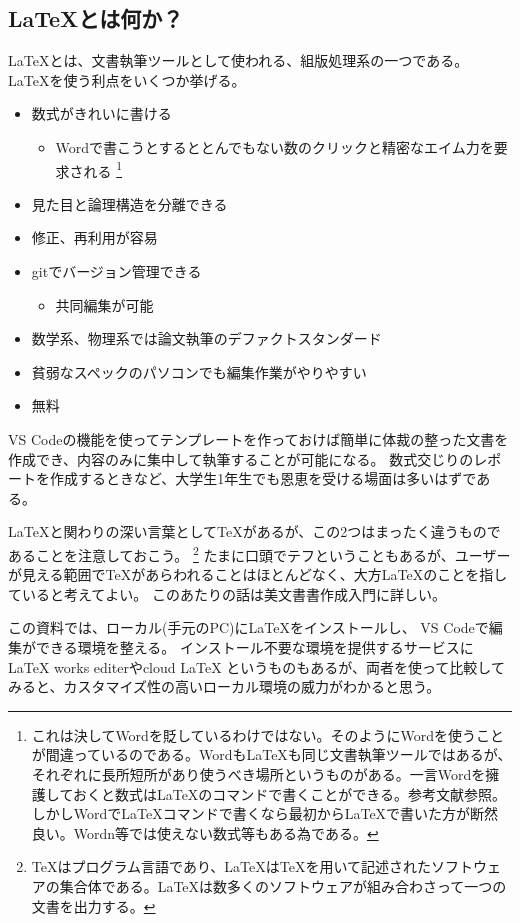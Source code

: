 \documentclass[titlepage]{ltjsarticle}
\begin{document}
\subsection{\LaTeX とは何か？}
\LaTeX とは、文書執筆ツールとして使われる、組版処理系の一つである。
\LaTeX を使う利点をいくつか挙げる。
\begin{itemize}
  \item 数式がきれいに書ける
  \begin{itemize}
    \item Wordで書こうとするととんでもない数のクリックと精密なエイム力を要求される
    \footnote{これは決してWordを貶しているわけではない。そのようにWordを使うことが間違っているのである。Wordも\LaTeX も同じ文書執筆ツールではあるが、それぞれに長所短所があり使うべき場所というものがある。一言Wordを擁護しておくと数式は\LaTeX のコマンドで書くことができる。参考文献\cite{WordでLaTeX}参照。しかしWordでLaTeXコマンドで書くなら最初から\LaTeX で書いた方が断然良い。Wordn等では使えない数式等もある為である。}
  \end{itemize}
  \item 見た目と論理構造を分離できる
  \item 修正、再利用が容易
  \item gitでバージョン管理できる
  \begin{itemize}
    \item 共同編集が可能
  \end{itemize}
  \item 数学系、物理系では論文執筆のデファクトスタンダード
  \item 貧弱なスペックのパソコンでも編集作業がやりやすい
  \item 無料
\end{itemize}
VS Codeの機能を使ってテンプレートを作っておけば簡単に体裁の整った文書を作成でき、内容のみに集中して執筆することが可能になる。
数式交じりのレポートを作成するときなど、大学生1年生でも恩恵を受ける場面は多いはずである。

\LaTeX と関わりの深い言葉として\TeX があるが、この2つはまったく違うものであることを注意しておこう。
\footnote{\TeX \index{\TeX}はプログラム言語であり、\LaTeX は\TeX を用いて記述されたソフトウェアの集合体である。\LaTeX は数多くのソフトウェアが組み合わさって一つの文書を出力する。}
たまに口頭でテフということもあるが、ユーザーが見える範囲で\TeX があらわれることはほとんどなく、大方\LaTeX のことを指していると考えてよい。
このあたりの話は美文書書作成入門\cite{美文書本}に詳しい。

この資料では、ローカル(手元のPC)に\LaTeX をインストールし、
VS Codeで編集ができる環境を整える。
インストール不要な環境を提供するサービスにLaTeX works editerやcloud LaTeX というものもあるが、両者を使って比較してみると、カスタマイズ性の高いローカル環境の威力がわかると思う。
\end{document}

